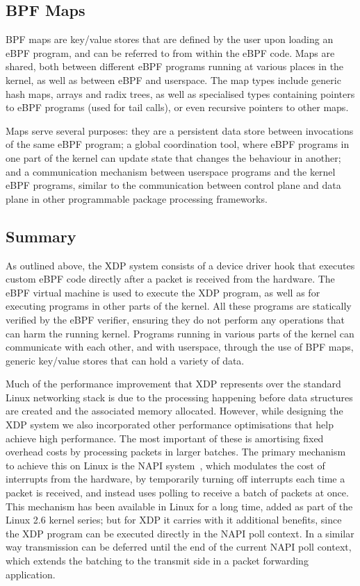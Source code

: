 \documentclass[10pt,sigconf,anonymous]{acmart}
\begin{document}
\subsection{BPF Maps}
\label{sec:bpf-maps}

BPF maps are key/value stores that are defined by the user upon loading an eBPF
program, and can be referred to from within the eBPF code. Maps are shared, both
between different eBPF programs running at various places in the kernel, as well
as between eBPF and userspace. The map types include generic hash maps, arrays
and radix trees, as well as specialised types containing pointers to eBPF
programs (used for tail calls), or even recursive pointers to other maps.

Maps serve several purposes: they are a persistent data store between
invocations of the same eBPF program; a global coordination tool, where eBPF
programs in one part of the kernel can update state that changes the behaviour
in another; and a communication mechanism between userspace programs and the
kernel eBPF programs, similar to the communication between control plane and
data plane in other programmable package processing frameworks.


\subsection{Summary}
\label{sec:design-summary}

As outlined above, the XDP system consists of a device driver hook that executes
custom eBPF code directly after a packet is received from the hardware. The eBPF
virtual machine is used to execute the XDP program, as well as for executing
programs in other parts of the kernel. All these programs are statically
verified by the eBPF verifier, ensuring they do not perform any operations that
can harm the running kernel. Programs running in various parts of the kernel can
communicate with each other, and with userspace, through the use of BPF maps,
generic key/value stores that can hold a variety of data.

Much of the performance improvement that XDP represents over the standard Linux
networking stack is due to the processing happening before data structures are
created and the associated memory allocated. However, while designing the XDP
system we also incorporated other performance optimisations that help achieve
high performance. The most important of these is amortising fixed overhead costs
by processing packets in larger batches. The primary mechanism to achieve this
on Linux is the NAPI system~\cite{napi}, which modulates the cost of interrupts
from the hardware, by temporarily turning off interrupts each time a packet is
received, and instead uses polling to receive a batch of packets at once. This
mechanism has been available in Linux for a long time, added as part of the
Linux 2.6 kernel series; but for XDP it carries with it additional benefits,
since the XDP program can be executed directly in the NAPI poll context. In a
similar way transmission can be deferred until the end of the current NAPI poll
context, which extends the batching to the transmit side in a packet forwarding
application.
\end{document}
